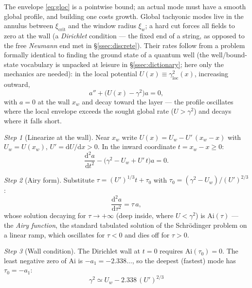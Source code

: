 \documentclass[11pt,a4paper]{article}
\numberwithin{equation}{section}
\theoremstyle{remark}
\newtheorem{step}{Step}[subsection]
\newcommand{\dd}{\mathrm{d}}
\begin{document}
The envelope \eqref{eq:gloc} is a pointwise bound; an actual mode must
have a smooth global profile, and building one costs growth. Global
tachyonic modes live in the annulus between $\xi_{\mathrm{crit}}$ and
the window radius $\xi_w$; a hard cut forces all fields to zero at the
wall (a \emph{Dirichlet} condition --- the fixed end of a string, as
opposed to the free \emph{Neumann} end met in \S\ref{ssec:discrete}).
Their rates follow from a problem formally identical to finding the
ground state of a quantum well (the well/bound-state vocabulary is
unpacked at leisure in \S\ref{ssec:dictionary}; here only the mechanics
are needed): in the local potential
$U(x)\equiv\gamma_{\mathrm{loc}}^2(x)$, increasing outward,
\begin{equation}
a''+\bigl(U(x)-\gamma^2\bigr)a=0 ,
\end{equation}
with $a=0$ at the wall $x_w$ and decay toward the layer --- the profile
oscillates where the local envelope exceeds the sought global rate
($U>\gamma^2$) and decays where it falls short.

\begin{step}[Linearize at the wall]
Near $x_w$ write $U(x)=U_w-U'\,(x_w-x)$ with $U_w=U(x_w)$,
$U'=\dd U/\dd x>0$. In the inward coordinate $t=x_w-x\ge0$:
\begin{equation}
\frac{\dd^2a}{\dd t^2}-\bigl(\gamma^2-U_w+U'\,t\bigr)a=0 .
\end{equation}
\end{step}

\begin{step}[Airy form]
Substitute $\tau=(U')^{1/3}t+\tau_0$ with
$\tau_0=(\gamma^2-U_w)/(U')^{2/3}$:
\begin{equation}
\frac{\dd^2a}{\dd\tau^2}=\tau\,a ,
\end{equation}
whose solution decaying for $\tau\to+\infty$ (deep inside, where
$U<\gamma^2$) is $\mathrm{Ai}(\tau)$ --- the \emph{Airy function}, the
standard tabulated solution of the Schr\"odinger problem on a linear
ramp, which oscillates for $\tau<0$ and dies off for $\tau>0$.
\end{step}

\begin{step}[Wall condition]
The Dirichlet wall at $t=0$ requires $\mathrm{Ai}(\tau_0)=0$. The least
negative zero of $\mathrm{Ai}$ is $-a_1=-2.338\ldots$, so the deepest
(fastest) mode has $\tau_0=-a_1$:
\begin{equation}
\boxed{\;
\gamma^2\simeq U_w-2.338\,(U')^{2/3}
\;}
\label{eq:airy}
\end{equation}
\end{step}
\end{document}
